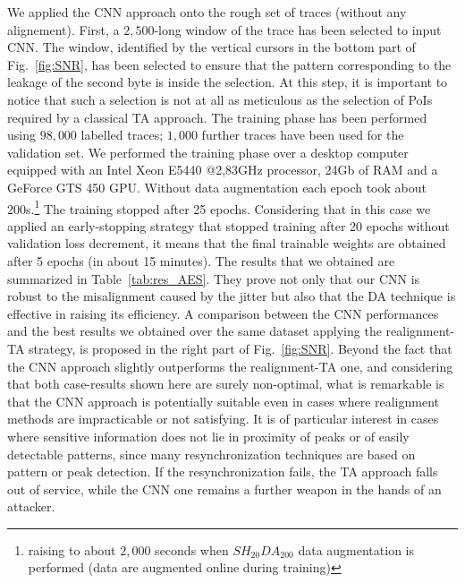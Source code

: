 We applied the CNN approach onto the rough set of traces (without any alignement). First, a $2,500$-long window of the trace has been selected to input CNN. The window, identified by the vertical cursors in the bottom part of Fig.~\ref{fig:SNR}, has been selected to ensure that the pattern corresponding to the leakage of the second byte is inside the selection. At this step, it is important to notice that such a selection is not at all  as meticulous as the selection of PoIs required by a classical TA approach. The training phase has been performed using $98,000$ labelled traces; $1,000$ further traces have been used for the validation set. We performed the training phase over a desktop computer equipped with an Intel Xeon E5440 @2,83GHz processor, 24Gb of RAM and a GeForce GTS 450 GPU. Without data augmentation each epoch took about 200s.\footnote{raising to about $2,000$ seconds when $SH_{20}DA_{200}$ data augmentation is performed (data are augmented online during training)} The training stopped after 25 epochs. Considering that in this case we applied an early-stopping strategy that stopped training after 20 epochs without validation loss decrement, it means that the final trainable weights are obtained after 5 epochs (in about 15 minutes). The results that we obtained are summarized in Table~\ref{tab:res_AES}. They prove not only that our CNN is robust to the misalignment caused by the jitter but also that the DA technique is effective in raising its efficiency. A comparison between the CNN performances and the best results we obtained over the same dataset applying the realignment-TA strategy, is proposed in the right part of Fig.~\ref{fig:SNR}. Beyond the fact that the CNN approach slightly outperforms the realignment-TA one, and considering that both case-results shown here are surely non-optimal, what is remarkable is that the CNN approach is potentially suitable even in cases where realignment methods are impracticable or not satisfying. It is of particular interest in cases where sensitive information does not lie in proximity of peaks or of easily detectable patterns, since many resynchronization techniques are based on pattern or peak detection. If the resynchronization fails, the TA approach falls out of service, while the CNN one remains a further weapon in the hands of an attacker.

